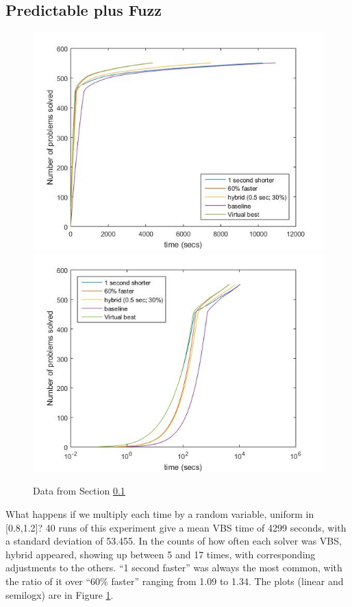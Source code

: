 \documentclass{article}
\begin{document}
\subsection{Predictable plus Fuzz}\label{sec:P+f}
\begin{figure}[h]
\caption{Data from Section \ref{sec:P+f}\label{Fig:S3}}
\includegraphics[scale=0.60]{Fig3a.jpg}
\includegraphics[scale=0.60]{Fig3b.jpg}
\end{figure}
What happens if we multiply each time by a random variable, uniform in [0.8,1.2]? 
40 runs of this experiment give a mean VBS time of 4299 seconds, with a standard deviation of 53.455. In the counts of how often each solver was VBS, hybrid appeared, showing up between 5 and 17 times, with corresponding adjustments to the others. ``1 second faster'' was always the most common, with the ratio of it over ``60\% faster'' ranging from 1.09 to 1.34. The plots (linear and semilogx) are in Figure \ref{Fig:S3}.
\end{document}
